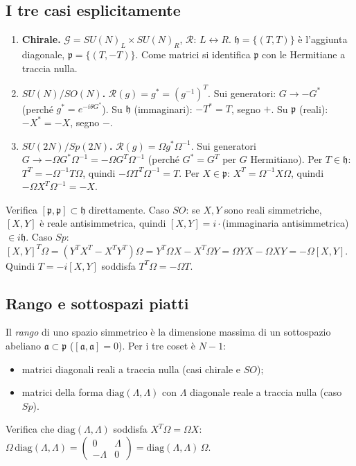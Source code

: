 \documentclass[11pt,a4paper]{article}
\numberwithin{equation}{section}
\theoremstyle{remark}
\newcommand{\G}{\mathcal{G}}
\newcommand{\p}{\mathfrak{p}}
\newcommand{\h}{\mathfrak{h}}
\begin{document}
\subsection{I tre casi esplicitamente}

\begin{enumerate}
\item \textbf{Chirale.} $\G=SU(N)_L\times SU(N)_R$, $\mathcal R$: $L\leftrightarrow R$. $\h=\{(T,T)\}$ è l'aggiunta diagonale, $\p=\{(T,-T)\}$. Come matrici si identifica $\p$ con le Hermitiane a traccia nulla.
\item \textbf{$SU(N)/SO(N)$.} $\mathcal R(g)=g^*=(g^{-1})^T$. Sui generatori: $G\to-G^*$ (perché $g^*=e^{-i\theta G^*}$). Su $\h$ (immaginari): $-T^*=T$, segno $+$. Su $\p$ (reali): $-X^*=-X$, segno $-$. \checkmark
\item \textbf{$SU(2N)/Sp(2N)$.} $\mathcal R(g)=\Omega g^*\Omega^{-1}$. Sui generatori $G\to-\Omega G^*\Omega^{-1}=-\Omega G^T\Omega^{-1}$ (perché $G^*=G^T$ per $G$ Hermitiano). Per $T\in\h$: $T^T=-\Omega^{-1}T\Omega$, quindi $-\Omega T^T\Omega^{-1}=T$. Per $X\in\p$: $X^T=\Omega^{-1}X\Omega$, quindi $-\Omega X^T\Omega^{-1}=-X$. \checkmark
\end{enumerate}

\begin{verifica}
Verifica $[\p,\p]\subset\h$ direttamente. Caso $SO$: se $X,Y$ sono reali simmetriche, $[X,Y]$ è reale antisimmetrica, quindi $[X,Y]=i\cdot$(immaginaria antisimmetrica) $\in i\h$. Caso $Sp$: $[X,Y]^T\Omega=(Y^TX^T-X^TY^T)\Omega=Y^T\Omega X-X^T\Omega Y=\Omega YX-\Omega XY=-\Omega[X,Y]$. Quindi $T=-i[X,Y]$ soddisfa $T^T\Omega=-\Omega T$. \checkmark
\end{verifica}

\subsection{Rango e sottospazi piatti}

Il \emph{rango} di uno spazio simmetrico è la dimensione massima di un sottospazio abeliano $\mathfrak a\subset\p$ ($[\mathfrak a,\mathfrak a]=0$). Per i tre coset è $N-1$:
\begin{itemize}[nosep]
\item matrici diagonali reali a traccia nulla (casi chirale e $SO$);
\item matrici della forma $\mathrm{diag}(\Lambda,\Lambda)$ con $\Lambda$ diagonale reale a traccia nulla (caso $Sp$).
\end{itemize}
Verifica che $\mathrm{diag}(\Lambda,\Lambda)$ soddisfa $X^T\Omega=\Omega X$: $\Omega\,\mathrm{diag}(\Lambda,\Lambda)=\begin{pmatrix}0&\Lambda\\-\Lambda&0\end{pmatrix}=\mathrm{diag}(\Lambda,\Lambda)\,\Omega$. \checkmark
\end{document}
